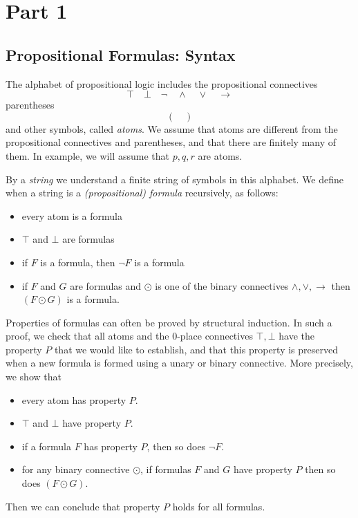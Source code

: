 \section{Part 1}
\subsection{Propositional Formulas: Syntax}
The alphabet of propositional logic includes the propositional connectives
\begin{equation*}
 \top \quad \bot \quad \neg \quad \wedge \quad \vee \quad \rightarrow
\end{equation*}
parentheses
\begin{equation*}
 \left( \quad \right)
\end{equation*}
and other symbols, called \textit{atoms}. We assume that atoms are different from the propositional connectives and parentheses, and that there are finitely many of them. In example, we will assume that $p, q, r$ are atoms. 

By a \textit{string} we understand a finite string of symbols in this alphabet. We define when a string is a \textit{(propositional) formula} recursively, as follows: 
\begin{itemize}
\item every atom is a formula
\item $\top$ and $\bot$ are formulas
\item if $F$ is a formula, then $\neg F$ is a formula
\item if $F$ and $G$ are formulas and $\odot$ is one of the binary connectives $\wedge, \vee, \rightarrow$ then $\left( F \odot G \right)$ is a formula. 
\end{itemize}

Properties of formulas can often be proved by structural induction. In such a proof, we check that all  atoms and the 0-place connectives $\top, \bot$ have the property $P$ that we would like to establish, and that this property is preserved when a new formula is formed using a unary or binary connective. More precisely, we show that 
\begin{itemize}
\item every atom has property $P$.
\item $\top$ and $\bot$ have property $P$. 
\item if a formula $F$ has property $P$, then so does $\neg F$. 
\item for any binary connective $\odot$, if formulas $F$ and $G$ have property $P$ then so does $\left( F \odot G \right)$. 
\end{itemize}
Then we can conclude that property $P$ holds for all formulas. 

